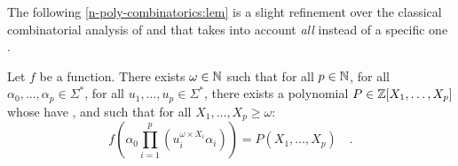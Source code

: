 \documentclass[sigconf,natbib=false,screen, review,anonymous]{acmart}
\begin{document}
The following \cref{n-poly-combinatorics:lem} is a slight refinement over the
classical combinatorial analysis of 
\cite[Lemma 4.16]{LOPEZ23b} and  that takes
into account \emph{all}  instead of a specific one
\cite[Lemma 5.37]{gaetanphd}.

\begin{lemma}
    \label{n-poly-combinatorics:lem}
    Let $f$ be a   function. 
    There exists $\omega \in \mathbb{N}$
    such that for all $p \in \mathbb{N}$,
    for all $\alpha_0, \dots, \alpha_p \in \Sigma^*$,
    for all $u_1, \dots, u_p \in \Sigma^*$,
    there exists a polynomial $P \in \mathbb{Z}[X_1, \dots, X_p]$
    whose  have ,
    and such that for all $X_1, \dots, X_p \geq \omega$:
    \begin{equation*}
        f\left(
            \alpha_0 \prod_{i = 1}^p (u_i^{\omega \times X_i} \alpha_i)
        \right)
        = P(X_1, \dots, X_p) \quad .
    \end{equation*}
\end{lemma}
\end{document}
